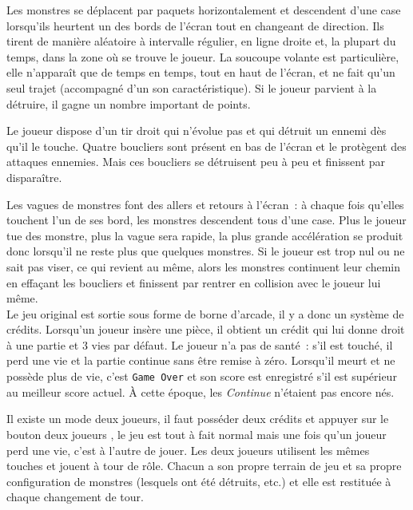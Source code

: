 Les monstres se déplacent par paquets horizontalement et descendent d'une case
lorsqu'ils heurtent un des bords de l'écran tout en changeant de direction.
Ils tirent de manière aléatoire à intervalle régulier, en ligne droite et, la
plupart du temps, dans la zone où se trouve le joueur. La soucoupe volante est
particulière, elle n'apparaît que de temps en temps, tout en haut de l'écran,
et ne fait qu'un seul trajet (accompagné d'un son caractéristique). Si le joueur
parvient à la détruire, il gagne un nombre important de points.

Le joueur dispose d'un tir droit qui n'évolue pas et qui détruit un ennemi dès
qu'il le touche. Quatre boucliers sont présent en bas de l'écran et le
protègent des attaques ennemies. Mais ces boucliers se détruisent peu à peu et
finissent par disparaître.

Les vagues de monstres font des allers et retours à l'écran~: à chaque fois
qu'elles touchent l'un de ses bord, les monstres descendent tous d'une case.
Plus le joueur tue des monstre, plus la vague sera rapide, la plus grande
accélération se produit donc lorsqu'il ne reste plus que quelques monstres.
Si le joueur est trop nul ou ne sait pas viser, ce qui revient au même, alors
les monstres continuent leur chemin en \og effaçant \fg les boucliers et
finissent par rentrer en collision avec le joueur lui même.
\\

Le jeu original est sortie sous forme de borne d'arcade, il y a donc un
système de crédits. Lorsqu'un joueur insère une pièce, il obtient un crédit
qui lui donne droit à une partie et 3 vies par défaut. Le joueur n'a pas de
santé~: s'il est touché, il perd une vie et la partie continue sans être remise
à zéro. Lorsqu'il meurt et ne possède plus de vie, c’est \verb+Game Over+ et
son score est enregistré s'il est supérieur au meilleur score actuel. À
cette époque, les \emph{Continue} n'étaient pas encore nés.

Il existe un mode deux joueurs, il faut posséder deux crédits et appuyer
sur le bouton \og deux joueurs \fg, le jeu est tout à fait normal mais une
fois qu'un joueur perd une vie, c'est à l'autre de jouer. Les deux joueurs
utilisent les mêmes touches et jouent à tour de rôle. Chacun a son propre
terrain de jeu et sa propre configuration de monstres (lesquels ont été
détruits, etc.) et elle est restituée à chaque changement de tour.
